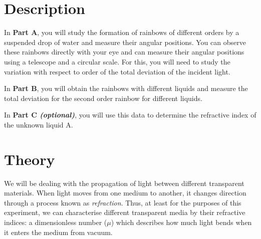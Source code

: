 \section*{Description}
In \textbf{Part A}, you will study the formation of rainbows of different orders by a suspended drop of water and measure their angular positions. You can observe these rainbows directly with your eye and can measure their angular positions using a telescope and a circular scale. For this, you will need to study the variation with respect to order of the total deviation of the incident light.

In \textbf{Part B}, you will obtain the rainbows with different liquids and measure the total deviation for the second order rainbow for different liquids.

In \textbf{Part C \textit{(optional)}}, you will use this data to determine the refractive index of the unknown liquid A. 


\section*{Theory}

We will be dealing with the propagation of light between different transparent materials. When light moves from one medium to another, it changes direction through a process known as \textit{refraction}. Thus, at least for the purposes of this experiment, we can characterise different transparent media by their refractive indices: a dimensionless number ($\mu$) which describes how much light bends when it enters the medium from vacuum. 

